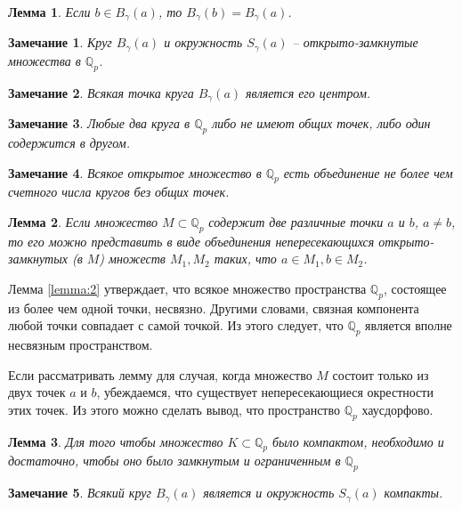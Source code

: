 \documentclass[master, och, diploma, times]{sty/SCWorks}
\theoremstyle{plain}
\newtheorem{lemma}{Лемма}
\newtheorem{note}{Замечание}
\theoremstyle{definition}
\begin{document}
\begin{lemma}
Если $b \in B_{\gamma}(a)$, то $B_{\gamma}(b)=B_{\gamma}(a)$.
\end{lemma}

\begin{note}
Круг $B_{\gamma}(a)$ и окружность $S_{\gamma}(a)$ -- открыто-замкнутые множества в $\mathbb {Q}_p$.
\end{note}

\begin{note}
Всякая точка круга $B_{\gamma}(a)$ является его центром.
\end{note}

\begin{note}
Любые два круга в $\mathbb {Q}_p$ либо не имеют общих точек, либо один содержится в другом.
\end{note}

\begin{note}
Всякое открытое множество в $\mathbb {Q}_p$ есть объединение не более чем счетного числа кругов без общих точек.
\end{note}

\begin{lemma} \label{lemma:2}
Если множество $M \subset \mathbb {Q}_p$ содержит две различные точки $a$ и $b$, $a \ne b$, то его можно представить в виде объединения непересекающихся открыто-замкнутых (в $M$) множеств $M_1, M_2$ таких, что $a \in M_1, b \in M_2$.
\end{lemma}

Лемма \eqref{lemma:2} утверждает, что всякое множество пространства $\mathbb {Q}_p$, состоящее из более чем одной точки, несвязно. Другими словами, связная компонента любой точки совпадает с самой точкой. Из этого следует, что $\mathbb {Q}_p$ является вполне несвязным пространством.

Если рассматривать лемму для случая, когда множество $M$ состоит только из двух точек $a$ и $b$, убеждаемся, что существует непересекающиеся окрестности этих точек. Из этого можно сделать вывод, что пространство $\mathbb {Q}_p$ хаусдорфово.

\begin{lemma}
Для того чтобы множество $K \subset \mathbb {Q}_p$ было компактом, необходимо и достаточно, чтобы оно было замкнутым и ограниченным в $\mathbb {Q}_p$
\end{lemma}

\begin{note}
Всякий круг $B_{\gamma}(a)$ является и окружность $S_{\gamma}(a)$ компакты.
\end{note}
\end{document}
